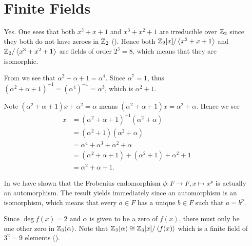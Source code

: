 \section{Finite Fields}
\begin{questions}
    \item Yes. One sees that both $x^3 + x + 1$ and $x^3 + x^2 + 1$ are irreducible over $\mathbb{Z}_2$ since they both do not have zeroes in $\mathbb{Z}_2$ (). Hence both $\mathbb{Z}_2[x]/\left\langle x^3+x+1\right\rangle$ and $\mathbb{Z}_2/\left\langle x^3+x^2+1\right\rangle$ are fields of order $2^3 = 8$, which means that they are isomorphic.

    \item \begin{partquestions}{\roman*}
        \item From  we see that $\alpha^2 + \alpha + 1 = \alpha^4$. Since $\alpha^7 = 1$, thus $(\alpha^2 + \alpha + 1)^{-1} = (\alpha^4)^{-1} = \alpha^3$, which is $\alpha^2 + 1$.

        \item Note $(\alpha^2 + \alpha + 1)x + \alpha^2 = \alpha$ means $(\alpha^2 + \alpha + 1)x = \alpha^2 + \alpha$. Hence we see
        \begin{align*}
            x &= (\alpha^2+\alpha+1)^{-1}(\alpha^2 + \alpha)\\
            &= (\alpha^2 + 1)(\alpha^2 + \alpha)\\
            &= \alpha^4 + \alpha^3 + \alpha^2 + \alpha\\
            &= (\alpha^2 + \alpha + 1) + (\alpha^2 + 1) + \alpha^2 + 1\\
            &= \alpha^2 + \alpha + 1.
        \end{align*}
    \end{partquestions}

    \item In  we have shown that the Frobenius endomorphism $\phi: F \to F, x \mapsto x^p$ is actually an automorphism. The result yields immediately since an automorphism is an isomorphism, which means that every $a \in F$ has a unique $b \in F$ such that $a = b^p$.

    \item Since $\deg f(x) = 2$ and $\alpha$ is given to be a zero of $f(x)$, there must only be one other zero in $\mathbb{Z}_3(\alpha)$. Note that $\mathbb{Z}_3(\alpha) \cong \mathbb{Z}_3[x]/\left\langle f(x)\right\rangle$ which is a finite field of $3^2 = 9$ elements ().


\end{questions}
